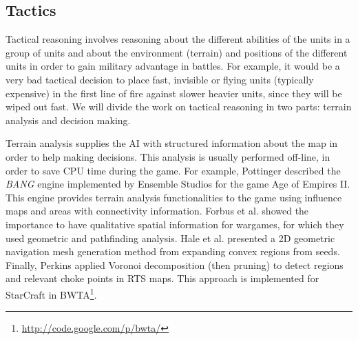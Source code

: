 \documentclass[journal]{IEEEtran}
\begin{document}

\subsection{Tactics}

Tactical reasoning involves reasoning about the different abilities of the units in a group of units and about the environment (terrain) and positions of the different units in order to gain military advantage in battles. For example, it would be a very bad tactical decision to place fast, invisible or flying units (typically expensive) in the first line of fire against slower heavier units, since they will be wiped out fast. We will divide the work on tactical reasoning in two parts: terrain analysis and decision making.

Terrain analysis supplies the AI with structured information about the map in order to help making decisions. This analysis is usually performed off-line, in order to save CPU time during the game. For example, Pottinger \cite{Pottinger00} described the \emph{BANG} engine implemented by Ensemble Studios for the game Age of Empires II. This engine provides terrain analysis functionalities to the game using influence maps and areas with connectivity information. 
Forbus et al. \cite{Forbus2002} showed the importance to have qualitative spatial information for wargames, for which they used geometric and pathfinding analysis. 
Hale et al. \cite{Hale08} presented a 2D geometric navigation mesh generation method from expanding convex regions from seeds. 
Finally, Perkins \cite{Perkins10} applied Voronoi decomposition (then pruning) %
to detect regions and relevant choke points in RTS maps. This approach is implemented for StarCraft in BWTA\footnote{\url{http://code.google.com/p/bwta/}}.
\end{document}
